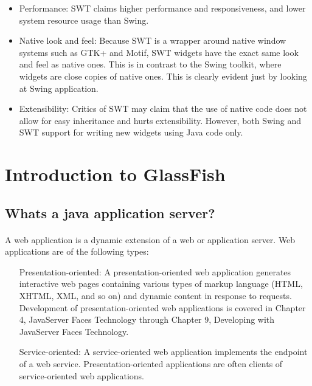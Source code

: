 \begin{itemize}
\item Performance: SWT claims higher performance and responsiveness, and lower system resource usage than Swing.

\item Native look and feel: Because SWT is a wrapper around native window systems such as GTK+ and Motif, SWT widgets have the exact same look and feel as native ones. This is in contrast to the Swing toolkit, where widgets are close copies of native ones. This is clearly evident just by looking at Swing application.

\item Extensibility: Critics of SWT may claim that the use of native code does not allow for easy inheritance and hurts extensibility. However, both Swing and SWT support for writing new widgets using Java code only.
\end{itemize}

\section{Introduction to GlassFish}

\subsection{Whats a java application server?}
\paragraph{}
A web application is a dynamic extension of a web or application server. Web applications are of the following types:

\begin{itemize}
\item[Presentation-oriented:] A presentation-oriented web application generates interactive web pages containing various types of markup language (HTML, XHTML, XML, and so on) and dynamic content in response to requests. Development of presentation-oriented web applications is covered in Chapter 4, JavaServer Faces Technology through Chapter 9, Developing with JavaServer Faces Technology.

\item[Service-oriented:] A service-oriented web application implements the endpoint of a web service. Presentation-oriented applications are often clients of service-oriented web applications. 
\end{itemize}

